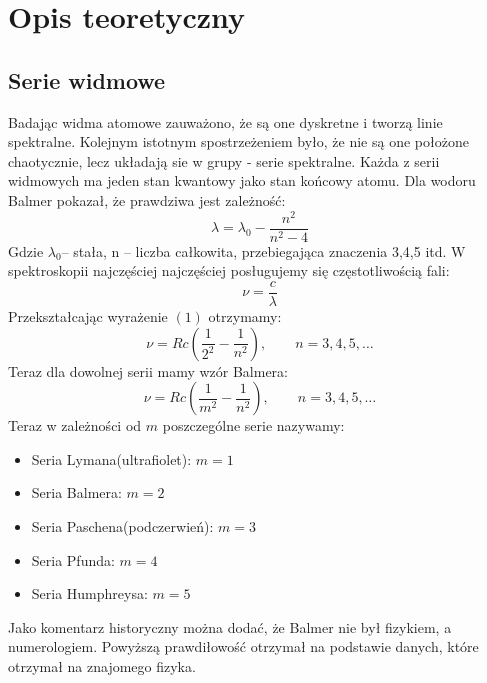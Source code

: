 \documentclass[paper=a4, fontsize=12pt]{scrartcl}
\begin{document}
\newpage
\section{Opis teoretyczny}
	
\subsection{Serie widmowe}
Badając widma atomowe zauważono, że są one dyskretne i tworzą linie spektralne. Kolejnym istotnym spostrzeżeniem było, że nie są one położone chaotycznie, lecz układają sie w grupy - serie spektralne. Każda z serii widmowych ma jeden stan kwantowy jako stan końcowy atomu. Dla wodoru Balmer pokazał, że prawdziwa jest zależność:
	\begin{equation}
	\lambda = \lambda_0 - \frac{n^2}{n^2 -4}
	\end{equation}
	Gdzie $\lambda_0$– stała, n – liczba całkowita, przebiegająca znaczenia 3,4,5 itd.
	W spektroskopii najczęściej najczęściej posługujemy się częstotliwością fali:
	\begin{equation*}
	\nu=\frac{c}{\lambda}
	\end{equation*}
Przekształcając wyrażenie $(1)$ otrzymamy:
		\begin{equation}
		\nu= Rc \left(  \frac{1}{2^2} - \frac{1}{n^2}  \right),\qquad n=3,4,5,\dots
		\end{equation}	
Teraz dla dowolnej serii mamy wzór Balmera:
		\begin{equation}
		\nu= Rc \left(  \frac{1}{m^2} - \frac{1}{n^2}  \right),\qquad n=3,4,5,\dots
		\end{equation}
Teraz w zależności od $m$ poszczególne serie nazywamy:
\begin{itemize}
	\item Seria Lymana(ultrafiolet): $m=1$
	\item Seria Balmera: $m=2$
	\item Seria Paschena(podczerwień): $m=3$
	\item Seria Pfunda: $m=4$
	\item Seria Humphreysa: $m=5$
\end{itemize}
Jako komentarz historyczny można dodać, że Balmer nie był fizykiem, a numerologiem. Powyższą prawdiłowość otrzymał na podstawie danych, które otrzymał na znajomego fizyka.
\end{document}
